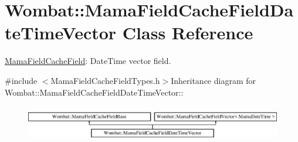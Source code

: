 \hypertarget{classWombat_1_1MamaFieldCacheFieldDateTimeVector}{
\section{Wombat::MamaFieldCacheFieldDateTimeVector Class Reference}
\label{classWombat_1_1MamaFieldCacheFieldDateTimeVector}
}


\hyperlink{classWombat_1_1MamaFieldCacheField}{MamaFieldCacheField}: DateTime vector field.  


{\ttfamily \#include $<$MamaFieldCacheFieldTypes.h$>$}Inheritance diagram for Wombat::MamaFieldCacheFieldDateTimeVector::\begin{figure}[H]
\begin{center}
\leavevmode
\includegraphics[height=1.62319cm]{classWombat_1_1MamaFieldCacheFieldDateTimeVector}
\end{center}
\end{figure}

